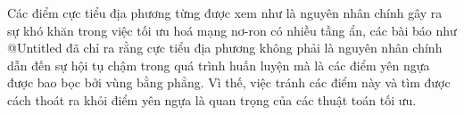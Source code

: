 Các điểm cực tiểu địa phương từng được xem như là nguyên nhân chính gây ra sự khó khăn trong việc tối ưu hoá mạng nơ-ron có nhiều tầng ẩn, các bài báo như @Untitled đã chỉ ra rằng cực tiểu địa phương không phải là nguyên nhân chính dẫn đến sự hội tụ chậm trong quá trình huấn luyện mà là các điểm yên ngựa được bao bọc bởi vùng bằng phẳng. Vì thế, việc tránh các điểm này và tìm được cách thoát ra khỏi điểm yên ngựa là quan trọng của các thuật toán tối ưu.



